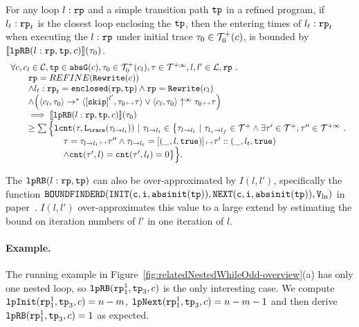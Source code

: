 %
\begin{lem}
 \label{lem:looprb-sound}
 For any loop $l: \mathtt{rp}$ and a simple transition path $\mathtt{tp}$ in a refined program, if $l_t: \mathtt{rp}_t$ is the closest loop enclosing the $\mathtt{tp}$, then the entering times of $l_t: \mathtt{rp}_t$ when executing the $l: \mathtt{rp}$ under initial trace $\mathtt{\tau}_0 \in \mathcal{T}^{+}_0(c)$, is bounded by $\llbracket \mathtt{lpRB}(l: \mathtt{rp}, \mathtt{tp}, c) \rrbracket(\mathtt{\tau}_0)$.
 \[
 \begin{array}{l}
 \forall c, c_l \in \cdom, \tpath \in \absG(c), \trace_0 \in \ftdom_0(c_l), \trace \in \tdom, l, l' \in \ldom, \rprog \sthat 
 \\ \qquad
 \rprog = {REFINE}(\algrewrite(c))
 \\ \qquad
 \land l_t: \rprog_t = \kw{enclosed}(\rprog, \tpath)
 \land 
 \rprog = \algrewrite(c_l)
 \\ \qquad
 \land
 \Big(
 \config{c_l, \trace_0} \to^* \config{\clabel{\eskip}^{l'}, \trace_0 \tracecat \trace}
 \lor \config{c_l, \trace_0} \uparrow^{\infty} \trace_0 \tracecat \trace 
 \Big)
 \\ \qquad
 \implies
 \econfig{\lpchB(l: \rprog, \tpath, c)}(\trace_0) 
 \\ \qquad \geq 
 \sum\Big\{
 \lcounter(\trace, \tracel(\trace_{l \to l_t})) ~\vert~ \trace_{l \to l_t} \in 
 \big\{\trace_{l \to l_t} 
 ~\vert~ \trace_{l_s \to l_f}\in \ftdom 
 \land \exists \trace' \in \ftdom, \trace''\in \tdom
 \sthat 
 \\ \qquad \qquad \qquad
 \trace = \trace_{l \to l_t} \tracecat \trace''
 \land \trace_{l \to l_t} = [(\_, l, \etrue)] \tracecat \trace' :: (\_, l_t, \etrue)
 \\ \qquad \qquad \qquad
 \land \counter(\trace', l) = \counter(\trace', l_t) = 0 
 \big\}
 \Big\}.
\end{array}
 \]
\end{lem}
%
The $\mathtt{lpRB}(l:\mathtt{rp}, \mathtt{tp})$ 
can also be over-approximated by
$I(l, l')$, specifically the function $\mathtt{BOUNDFINDERD(INIT(c, i, \mathtt{abs}{\mathtt{init}}(\mathtt{tp})), NEXT(c, i, \mathtt{abs}{\mathtt{init}}(\mathtt{tp})), V_{\ln})}$ in paper~\cite{GulwaniJK09}.
$I(l, l')$ over-approximates this value to a large extend 
by estimating the bound on iteration numbers of $l'$ in one iteration of $l$.

\paragraph{Example.}
The running example in Figure~\ref{fig:relatedNestedWhileOdd-overview}(a) has only one nested loop, so $\mathtt{lpRB}(\mathtt{rp}_1^1, \mathtt{tp}_3, c)$ is 
the only interesting case.
We compute $\mathtt{lpInit}(\mathtt{rp}_1^1, \mathtt{tp}_3, c) = n - m $,
$\mathtt{lpNext}(\mathtt{rp}_1^1, \mathtt{tp}_3, c) = n - m - 1$ and then derive $\mathtt{lpRB}(\mathtt{rp}_1^1, \mathtt{tp}_3, c) = 1$ as expected.

